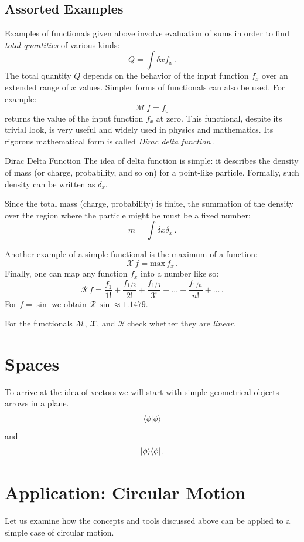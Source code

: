 \subsection*{Assorted Examples}
Examples of functionals given above involve evaluation of sums in order to find  \emph{total quantities} of various kinds:
\[
Q = \int \delta x f_x\,.
\]
The total quantity $Q$ depends on the behavior of the input function $f_x$ over an extended range of $x$ values. Simpler forms of functionals can also be used. For example:
\[
\mathcal{M}\, f = f_0
\]
returns the value of the input function $f_x$ at zero. This functional, despite its trivial look, is very useful and widely used in physics and mathematics. Its rigorous mathematical form is called \emph{Dirac delta function}\,.
\begin{mybio}{Dirac Delta Function}
	The idea of delta function is simple: it describes the density of mass (or charge, probability, and so on) for a point-like particle. Formally, such density can be written as $\delta_x$.
	
	Since the total mass (charge, probability) is finite, the summation of the density over the region where the particle might be must be a fixed number:
	\[
	m = \int \delta x \delta_x\,.
	\]
\end{mybio}

Another example of a simple functional is the maximum of a function:
\[
\mathcal{X}\,f = \textrm{max}\,f_x\,.
\]
Finally, one can map any function $f_x$ into a number like so:
\[
\mathcal{R}\,f = \frac{f_1}{1!} + \frac{f_{1/2}}{2!} + \frac{f_{1/3}}{3!}+\ldots+\frac{f_{1/n}}{n!}+\ldots\,.
\]
For $f=\sin$ we obtain $\mathcal{R}\,\sin\approx 1.1479$.
\begin{exercise}
	For the functionals $\mathcal{M}$, $\mathcal{X}$, and $\mathcal{R}$ check whether they are \emph{linear}.
\end{exercise}

\section{Spaces}

To arrive at the idea of vectors we will start with simple geometrical
objects -- arrows in a plane.
\[
\langle{\phi}|{\phi\rangle}
\]
and
\[
|{\phi}\rangle\langle{\phi}|\,.
\]

\section{Application: Circular Motion}
Let us examine how the concepts and tools discussed above can be applied to a simple case of circular motion.  

